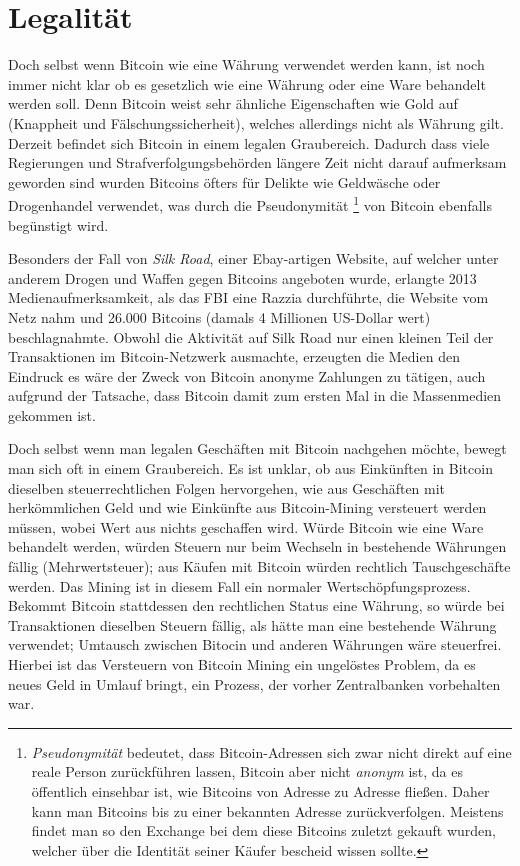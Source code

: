 \section{Legalität}

Doch selbst wenn Bitcoin wie eine Währung verwendet werden kann, ist noch immer nicht klar ob es gesetzlich wie eine Währung oder eine Ware behandelt werden soll.
Denn Bitcoin weist sehr ähnliche Eigenschaften wie Gold auf (Knappheit und Fälschungssicherheit), welches allerdings nicht als Währung gilt.
Derzeit befindet sich Bitcoin in einem legalen Graubereich.
Dadurch dass viele Regierungen und Strafverfolgungsbehörden längere Zeit nicht darauf aufmerksam geworden sind wurden Bitcoins öfters für Delikte wie Geldwäsche  oder Drogenhandel  verwendet, was durch die Pseudonymität%
\footnote{\emph{Pseudonymität} bedeutet, dass Bitcoin-Adressen sich zwar nicht direkt auf eine reale Person zurückführen lassen, Bitcoin aber nicht \emph{anonym} ist, da es öffentlich einsehbar ist, wie Bitcoins von Adresse zu Adresse fließen.
Daher kann man Bitcoins bis zu einer bekannten Adresse zurückverfolgen.
Meistens findet man so den Exchange bei dem diese Bitcoins zuletzt gekauft wurden, welcher über die Identität seiner Käufer bescheid wissen sollte.}
von Bitcoin ebenfalls begünstigt wird.

Besonders der Fall von \emph{Silk Road}, einer Ebay-artigen Website, auf welcher unter anderem Drogen und Waffen gegen Bitcoins angeboten wurde, erlangte 2013 Medienaufmerksamkeit, als das FBI eine Razzia durchführte, die Website vom Netz nahm und 26.000 Bitcoins (damals 4 Millionen US-Dollar wert) beschlagnahmte.
Obwohl die Aktivität auf Silk Road nur einen kleinen Teil der Transaktionen im Bitcoin-Netzwerk ausmachte, erzeugten die Medien den Eindruck es wäre der Zweck von Bitcoin anonyme Zahlungen zu tätigen, auch aufgrund der Tatsache, dass Bitcoin damit zum ersten Mal in die Massenmedien gekommen ist.

Doch selbst wenn man legalen Geschäften mit Bitcoin nachgehen möchte, bewegt man sich oft in einem Graubereich.
Es ist unklar, ob aus Einkünften in Bitcoin dieselben steuerrechtlichen Folgen hervorgehen, wie aus Geschäften mit herkömmlichen Geld und wie Einkünfte aus Bitcoin-Mining versteuert werden müssen, wobei Wert aus nichts geschaffen wird.
Würde Bitcoin wie eine Ware behandelt werden, würden Steuern nur beim Wechseln in bestehende Währungen fällig (Mehrwertsteuer); aus Käufen mit Bitcoin würden rechtlich Tauschgeschäfte werden.
Das Mining ist in diesem Fall ein normaler Wertschöpfungsprozess.
Bekommt Bitcoin stattdessen den rechtlichen Status eine Währung, so würde bei Transaktionen dieselben Steuern fällig, als hätte man eine bestehende Währung verwendet; Umtausch zwischen Bitocin und anderen Währungen wäre steuerfrei.
Hierbei ist das Versteuern von Bitcoin Mining ein ungelöstes Problem, da es neues Geld in Umlauf bringt, ein Prozess, der vorher Zentralbanken vorbehalten war.
